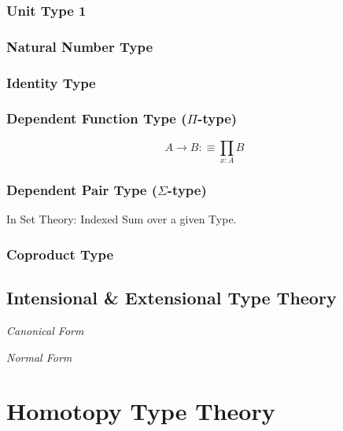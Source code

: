\documentclass{article}
\begin{document}
\subsubsection{Unit Type $\mathbf{1}$}

\subsubsection{Natural Number Type}

\subsubsection{Identity Type}

\subsubsection{Dependent Function Type ($\Pi$-type)}

\[
    A \rightarrow B :\equiv \prod_{x:A} B
\]

\subsubsection{Dependent Pair Type ($\Sigma$-type)}

In Set Theory: Indexed Sum over a given Type.

\subsubsection{Coproduct Type}



\subsection{Intensional \& Extensional Type Theory}
\label{subsec:intension_extension}

\emph{Canonical Form}

\emph{Normal Form}



\section{Homotopy Type Theory}\label{sec:homotopy_type}
\end{document}
